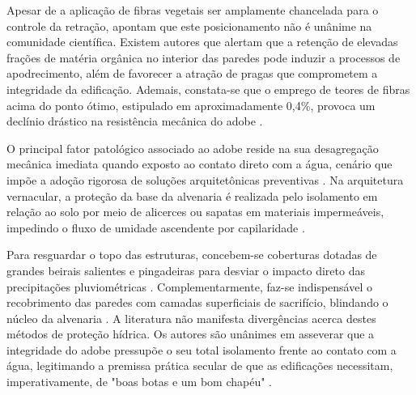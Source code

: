 
Apesar de a aplicação de fibras vegetais ser amplamente chancelada para o controle da retração,  apontam que este posicionamento não é unânime na comunidade científica. Existem autores que alertam que a retenção de elevadas frações de matéria orgânica no interior das paredes pode induzir a processos de apodrecimento, além de favorecer a atração de pragas que comprometem a integridade da edificação. Ademais, constata-se que o emprego de teores de fibras acima do ponto ótimo, estipulado em aproximadamente 0,4\%, provoca um declínio drástico na resistência mecânica do adobe \cite{Bailly2024,PachecoTorgal2012}.


O principal fator patológico associado ao adobe reside na sua desagregação mecânica imediata quando exposto ao contato direto com a água, cenário que impõe a adoção rigorosa de soluções arquitetônicas preventivas \cite{Barroso2019,Rosicki2022}. Na arquitetura vernacular, a proteção da base da alvenaria é realizada pelo isolamento em relação ao solo por meio de alicerces ou sapatas em materiais impermeáveis, impedindo o fluxo de umidade ascendente por capilaridade \cite{Barroso2019,GomezPatrocinio2021,Junior2021,Rocco2024}. 

Para resguardar o topo das estruturas, concebem-se coberturas dotadas de grandes beirais salientes e pingadeiras para desviar o impacto direto das precipitações pluviométricas \cite{Barroso2019,GomezPatrocinio2021,Junior2021}. Complementarmente, faz-se indispensável o recobrimento das paredes com camadas superficiais de sacrifício, blindando o núcleo da alvenaria \cite{Barroso2019,GomezPatrocinio2021,Rocco2024}. A literatura não manifesta divergências acerca destes métodos de proteção hídrica. Os autores são unânimes em asseverar que a integridade do adobe pressupõe o seu total isolamento frente ao contato com a água, legitimando a premissa prática secular de que as edificações necessitam, imperativamente, de "boas botas e um bom chapéu" \cite{Barroso2019,GomezPatrocinio2021,Junior2021,Rocco2024}.


